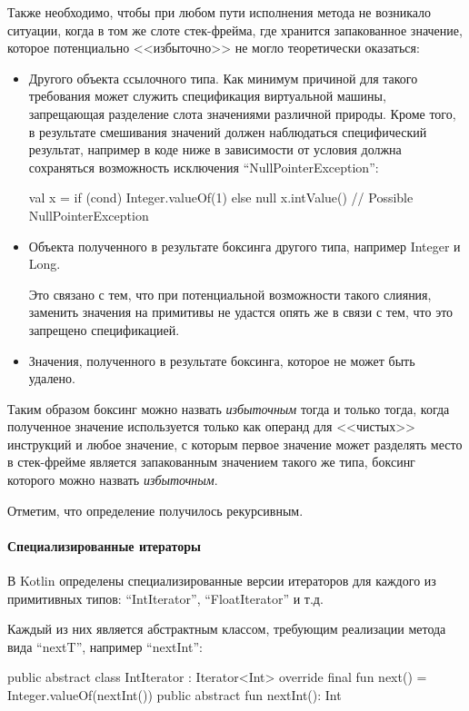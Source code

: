 Также необходимо, чтобы при любом пути исполнения метода не возникало ситуации, когда в том же
слоте стек-фрейма, где хранится запакованное значение, которое потенциально <<избыточно>>
не могло теоретически оказаться:
\begin{itemize}
    \item Другого объекта ссылочного типа. Как минимум причиной для такого требования может служить
    спецификация виртуальной машины, запрещающая разделение слота значениями различной природы.
    Кроме того, в результате смешивания значений должен наблюдаться специфический результат,
    например в коде ниже в зависимости от условия должна сохраняться возможность исключения
    ``NullPointerException'':
    \begin{pyglist}[language=kotlin]
        val x = if (cond) Integer.valueOf(1) else null
        x.intValue() // Possible NullPointerException
    \end{pyglist}

    \item Объекта полученного в результате боксинга другого типа, например Integer и Long.

    Это связано с тем, что при потенциальной возможности такого слияния, заменить значения на
    примитивы не удастся опять же в связи с тем, что это запрещено спецификацией.

    \item Значения, полученного в результате боксинга, которое не может быть удалено.
\end{itemize}

Таким образом боксинг можно назвать \textit{избыточным} тогда и только тогда, когда полученное
значение используется только как операнд для <<чистых>> инструкций и любое значение, с которым
первое значение может разделять место в стек-фрейме является запакованным значением такого же
типа, боксинг которого можно назвать \textit{избыточным}.

Отметим, что определение получилось рекурсивным.

\paragraph{Специализированные итераторы}
В Kotlin определены специализированные версии итераторов для каждого из примитивных типов:
``IntIterator'', ``FloatIterator'' и т.д.

Каждый из них является абстрактным классом, требующим реализации метода вида ``nextT'', например
``nextInt'':
\begin{pyglist}[language=kotlin]
    public abstract class IntIterator : Iterator<Int> {
        override final fun next() = Integer.valueOf(nextInt())
        public abstract fun nextInt(): Int
    }
\end{pyglist}

